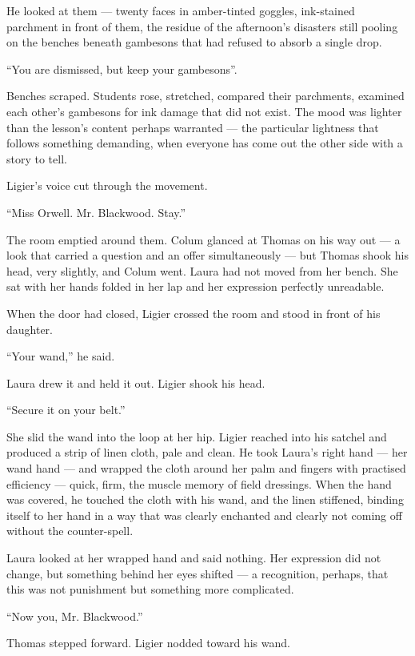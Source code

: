 He looked at them --- twenty faces in amber-tinted goggles, ink-stained parchment in front of them, the residue of the afternoon's disasters still pooling on the benches beneath gambesons that had refused to absorb a single drop.
 
\enquote{You are dismissed, but keep your gambesons}.
 
Benches scraped. Students rose, stretched, compared their parchments, examined each other's gambesons for ink damage that did not exist. The mood was lighter than the lesson's content perhaps warranted --- the particular lightness that follows something demanding, when everyone has come out the other side with a story to tell.
 
Ligier's voice cut through the movement.
 
\enquote{Miss Orwell. Mr. Blackwood. Stay.}
 
The room emptied around them. Colum glanced at Thomas on his way out --- a look that carried a question and an offer simultaneously --- but Thomas shook his head, very slightly, and Colum went. Laura had not moved from her bench. She sat with her hands folded in her lap and her expression perfectly unreadable.
 
When the door had closed, Ligier crossed the room and stood in front of his daughter.
 
\enquote{Your wand,} he said.
 
Laura drew it and held it out. Ligier shook his head.
 
\enquote{Secure it on your belt.}
 
She slid the wand into the loop at her hip. Ligier reached into his satchel and produced a strip of linen cloth, pale and clean. He took Laura's right hand --- her wand hand --- and wrapped the cloth around her palm and fingers with practised efficiency --- quick, firm, the muscle memory of field dressings. When the hand was covered, he touched the cloth with his wand, and the linen stiffened, binding itself to her hand in a way that was clearly enchanted and clearly not coming off without the counter-spell.
 
Laura looked at her wrapped hand and said nothing. Her expression did not change, but something behind her eyes shifted --- a recognition, perhaps, that this was not punishment but something more complicated.
 
\enquote{Now you, Mr. Blackwood.}
 
Thomas stepped forward. Ligier nodded toward his wand.
 
